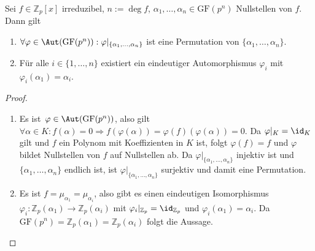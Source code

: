 \begin{lemma}
    Sei $f \in \mathbb{Z}_p[x]$ irreduzibel, $n := \deg f$, $\alpha_1, \ldots, \alpha_n \in \mathrm{GF}(p^n)$ Nullstellen von $f$. Dann gilt
    \begin{enumerate}
        \item $\forall \varphi \in \Aut(\mathrm{GF}(p^n)): \varphi\vert_{\{\alpha_1, \ldots, \alpha_n\}}$ ist eine Permutation von $\{\alpha_1, \ldots, \alpha_n\}$.
        \item Für alle $i \in \{1, \ldots, n\}$ existiert ein eindeutiger Automorphismus $\varphi_i$ mit $\varphi_i(\alpha_1) = \alpha_i$.
    \end{enumerate}
\end{lemma}
\begin{proof}{\ }
    \begin{enumerate}
        \item Es ist $\varphi \in \Aut(\mathrm{GF}(p^n))$, also gilt $\forall \alpha\in K: f(\alpha) = 0 \Rightarrow f(\varphi(\alpha)) = \varphi(f)(\varphi(\alpha)) = 0$. Da $\varphi\vert_K=\id_K$ gilt und $f$ ein Polynom mit Koeffizienten in $K$ ist, folgt $\varphi(f)=f$ und $\varphi$ bildet Nullstellen von $f$ auf Nullstellen ab.
        Da $\varphi\vert_{\{\alpha_1, \ldots, \alpha_n\}}$ injektiv ist und $\{\alpha_1, \ldots, \alpha_n\}$ endlich ist, ist $\varphi\vert_{\{\alpha_1, \ldots, \alpha_n\}}$ surjektiv und damit eine Permutation.
        \item Es ist $f = \mu_{\alpha_1} = \mu_{\alpha_i}$, also gibt es einen eindeutigen Isomorphismus $\varphi_i: \mathbb{Z}_p(\alpha_1) \to \mathbb{Z}_p(\alpha_i)$ mit $\varphi_i\vert_{\mathbb{Z}_p} = \id_{\mathbb{Z}_p}$ und $\varphi_i(\alpha_1) = \alpha_i$. Da $\mathrm{GF}(p^n) = \mathbb{Z}_p(\alpha_1) = \mathbb{Z}_p(\alpha_i)$ folgt die Aussage.
     \end{enumerate}
\end{proof}

